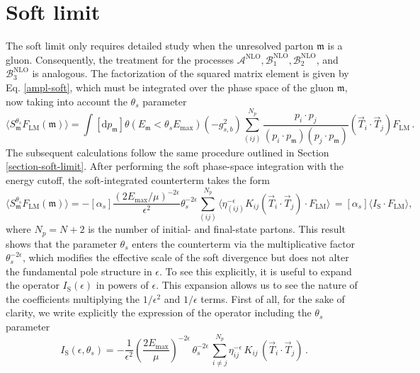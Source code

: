 \documentclass[a4paper, 12pt]{book}
\newcommand{\um}{\mathfrak{m}}
\begin{document}
\section{Soft limit}

The soft limit only requires detailed study when the unresolved parton $\um$ is a gluon. Consequently, the treatment for the processes $\mathcal{A}^{\mathrm{NLO}}, \mathcal{B}_1^{\mathrm{NLO}}, \mathcal{B}_2^{\mathrm{NLO}}$, and $\mathcal{B}_3^{\mathrm{NLO}}$  is analogous. The factorization of the squared matrix element is given by Eq. \ref{ampl-soft}, which must be integrated over the phase space of the gluon $\um$, now taking into account the $\theta_s$ parameter
\begin{equation}
  \langle S_\um^{\theta_s} F_\mathrm{LM}(\um) \rangle = \int [\mathrm{d}p_\um] \theta(E_\um < \theta_s E_{\mathrm{max}}) (-g^2_{s,b}) \sum _{(ij)}^{N_p} \frac{p_i \cdot p_j}{(p_i \cdot p_\um)(p_j \cdot p_\um)} (\vec{T}_i \cdot \vec{T}_j) F_\mathrm{LM} \, .
\end{equation}
The subsequent calculations follow the same procedure outlined in Section \ref{section-soft-limit}. After performing the soft phase-space integration with the energy cutoff, the soft-integrated counterterm takes the form
\begin{equation}
  \langle S_\um^{\theta_s} F_\mathrm{LM}(\um) \rangle = - [\alpha_s] \frac{\left(2E_{\mathrm{max}}/\mu\right)^{-2\epsilon}}{\epsilon^2} \theta_s^{-2\epsilon}\sum_{(ij)}^{N_p} \langle \eta_{(ij)}^{-\epsilon} K_{ij} (\vec{T}_i \cdot \vec{T}_j) \cdot F_\mathrm{LM} \rangle \, = [\alpha_s] \langle I_{\mathrm{S}}\cdot F_{\mathrm{LM}} \rangle ,
\end{equation}
where $N_p = N+2$ is the number of initial- and final-state partons. This result shows that the parameter $\theta_s$ enters the counterterm via the multiplicative factor $\theta_s^{-2\epsilon}$, which modifies the effective scale of the soft divergence but does not alter the fundamental pole structure in $\epsilon$. To see this explicitly, it is useful to expand the operator $ I_{\mathrm{S}} (\epsilon)$ in powers of $\epsilon$. This expansion allows us to see the nature of the coefficients multiplying the $1/\epsilon^2$ and $1/\epsilon$ terms.  First of all, for the sake of clarity, we write explicitly the expression of the operator including the $\theta_s$ parameter
\begin{equation}
  I_{\mathrm{S}} (\epsilon, \theta_s)= -\frac{1}{\epsilon^2} \left(\frac{2E_{\mathrm{max}}}{\mu}\right)^{-2\epsilon} \, \theta_s^{-2\epsilon} \, \sum_{i \neq j }^{N_p} \eta_{ij}^{-\epsilon} \, K_{ij} \, \left( \vec{T}_i \cdot \vec{T}_j\right) \,. 
\end{equation}
\end{document}

